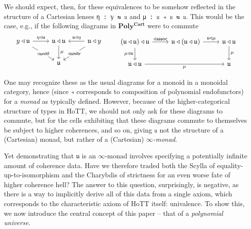 \documentclass[
  11pt,
  oneside,
  article]{memoir}
\theoremstyle{definition}
\theoremstyle{plain}
\newcommand{\0}{\textsf{0}}
\newcommand{\1}{\tn{\textsf{1}}}
\begin{document}
We should expect, then, for these equivalences to be somehow reflected
in the structure of a Cartesian lenses \texttt{η\ :\ 𝕪\ ⇆\ 𝔲} and
\texttt{μ\ :\ 𝔲\ ◃\ 𝔲\ ⇆\ 𝔲}. This would be the case, e.g., if the
following diagrams in \(\mathbf{Poly^{Cart}}\) were to commute \[
\begin{tikzcd}
    {y \triangleleft \mathfrak{u}} & {\mathfrak{u} \triangleleft \mathfrak{u} } & {\mathfrak{u} \triangleleft y} \\
    & {\mathfrak{u}}
    \arrow["{\eta \triangleleft \mathfrak{u}}", from=1-1, to=1-2]
    \arrow["{\mathsf{\triangleleft unitl}}"{description}, from=1-1, to=2-2]
    \arrow["\mu", from=1-2, to=2-2]
    \arrow["{\mathfrak{u} \triangleleft \eta}"', from=1-3, to=1-2]
    \arrow["{\mathsf{\triangleleft unitr}}"{description}, from=1-3, to=2-2]
\end{tikzcd} \qquad \begin{tikzcd}
    {(\mathfrak{u} \triangleleft \mathfrak{u}) \triangleleft \mathfrak{u}} & {\mathfrak{u} \triangleleft (\mathfrak{u} \triangleleft \mathfrak{u})} & {\mathfrak{u} \triangleleft \mathfrak{u}} \\
    {\mathfrak{u} \triangleleft \mathfrak{u}} && {\mathfrak{u}}
    \arrow["{\mathsf{\triangleleft assoc}}", from=1-1, to=1-2]
    \arrow["{\mu \triangleleft \mathfrak{u}}"', from=1-1, to=2-1]
    \arrow["{\mathfrak{u} \triangleleft \mu}", from=1-2, to=1-3]
    \arrow["\mu", from=1-3, to=2-3]
    \arrow["\mu"', from=2-1, to=2-3]
\end{tikzcd}
\]

One may recognize these as the usual diagrams for a monoid in a monoidal
category, hence (since \texttt{◃} corresponds to composition of
polynomial endofunctors) for a \emph{monad} as typically defined.
However, because of the higher-categorical structure of types in HoTT,
we should not only ask for these diagrams to commute, but for the cells
exhibiting that these diagrams commute to themselves be subject to
higher coherences, and so on, giving \texttt{𝔲} not the structure of a
(Cartesian) monad, but rather of a (Cartesian) \emph{\(\infty\)-monad}.

Yet demonstrating that \(𝔲\) is an \(\infty\)-monad involves specifying
a potentially infinite amount of coherence data. Have we therefore
traded both the Scylla of equality-up-to-isomorphism and the Charybdis
of strictness for an even worse fate of higher coherence hell? The
answer to this question, surprisingly, is negative, as there is a way to
implicitly derive all of this data from a single axiom, which
corresponds to the characteristic axiom of HoTT itself: univalence. To
show this, we now introduce the central concept of this paper -- that of
a \emph{polynomial universe}.
\end{document}
